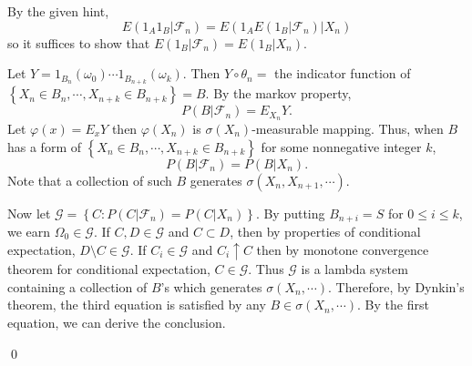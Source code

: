 \begin{problem}[5.2.1] \hfill

	By the given hint,
	\[
		E(1_A 1_B \lvert \mathcal{F}_n) = E(1_A E(1_B \lvert \mathcal{F}_n) \lvert X_n)
	\]
	so it suffices to show that $E(1_B \lvert \mathcal{F}_n) = E(1_B \lvert X_n)$.

	Let $Y = 1_{B_n}(\omega_0) \cdots 1_{B_{n+k}}(\omega_k)$.
	Then $Y \circ \theta_n =$ the indicator function of $\left\{ X_n \in B_n , \cdots, X_{n+k} \in B_{n+k} \right\} = B$.
	By the markov property,
	\[
		P(B\lvert \mathcal{F}_n) = E_{X_n}Y.
	\]
	Let $\varphi(x) = E_x Y$ then $\varphi(X_n)$ is $\sigma(X_n)$-measurable mapping.
	Thus, when $B$ has a form of $\left\{ X_n \in B_n, \cdots, X_{n+k} \in B_{n+k} \right\}$ for some nonnegative integer $k$,
	\[
		P(B\lvert \mathcal{F}_n) = P(B\lvert X_n).
	\]
	Note that a collection of such $B$ generates $\sigma(X_n, X_{n+1}, \cdots)$.

	Now let $\mathcal{G} = \left\{ C: P(C\lvert \mathcal{F}_n) = P(C\lvert X_n) \right\}$.
	By putting $B_{n+i} = S$ for $0 \leq i \leq k$, we earn $\Omega_0 \in \mathcal{G}$.
	If $C, D \in \mathcal{G}$ and $C \subset D$, then by properties of conditional expectation, $D\setminus C \in \mathcal{G}$.
	If $C_i \in \mathcal{G}$ and $C_i \uparrow C$ then by monotone convergence theorem for conditional expectation, $C \in \mathcal{G}$.
	Thus $\mathcal{G}$ is a lambda system containing a collection of $B$'s which generates $\sigma(X_n, \cdots)$.
	Therefore, by Dynkin's theorem, the third equation is satisfied by any $B \in \sigma(X_n, \cdots)$.
	By the first equation, we can derive the conclusion.

	\qed
\end{problem}

